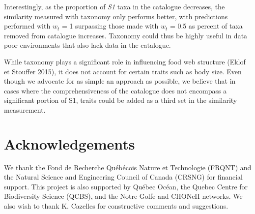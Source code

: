 \documentclass[letterpaper]{article}
\begin{document}
 Interestingly, as the proportion of \textit{S1} taxa in the catalogue decreases, the similarity measured with taxonomy only performs better, with predictions performed with $w_t$ = 1 surpassing those made with $w_t$ = 0.5 as percent of taxa removed from catalogue increases. Taxonomy could thus be highly useful in data poor environments that also lack data in the catalogue.

While taxonomy plays a significant role in influencing food web structure (Eklof et Stouffer 2015), it does not account for certain traits such as body size. Even though we advocate for as simple an approach as possible, we believe that in cases where the comprehensiveness of the catalogue does not encompass a significant portion of S1, traits could be added as a third set in the similarity measurement.


\section{Acknowledgements}
We thank the Fond de Recherche Québécois Nature et Technologie (FRQNT) and the Natural Science and Engineering Council of Canada (CRSNG) for financial support. This project is also supported by Québec Océan, the Quebec Centre for Biodiversity Science (QCBS), and the Notre Golfe and CHONeII networks. We also wish to thank K. Cazelles for constructive comments and suggestions.
\end{document}
